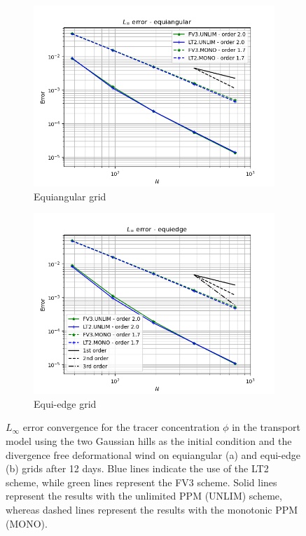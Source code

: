 \documentclass[preprint,12pt]{elsarticle}
\begin{document}
\begin{linenumbers}
\begin{figure}[!htb]
	\centering
	\begin{subfigure}{0.45\textwidth}
		\centering
		\includegraphics[width=1.1\linewidth]{linferror_tc-5_alpha0.equiangular}
		\caption{Equiangular grid\label{ndivnair-equiangular-linf}}
	\end{subfigure}
	\begin{subfigure}{0.45\textwidth}
	\centering
	\includegraphics[width=1.1\linewidth]{linferror_tc-5_alpha0.equiedge}
	\caption{Equi-edge grid\label{ndivnair-equiedge-linf}}
    \end{subfigure}
	\caption{
		$L_{\infty}$ error convergence for the tracer concentration $\phi$ in the transport model using the two Gaussian hills  as the initial condition and  the divergence free deformational wind on equiangular (a)
and equi-edge (b) grids  after 12 days.
Blue lines indicate the use of the LT2 scheme, while green lines represent the FV3 scheme.
Solid lines represent the results with the unlimited PPM (UNLIM) scheme, whereas dashed lines represent the results with the monotonic PPM (MONO).
		\label{ndivnair-linf}}
\end{figure}


\end{linenumbers}
\end{document}
